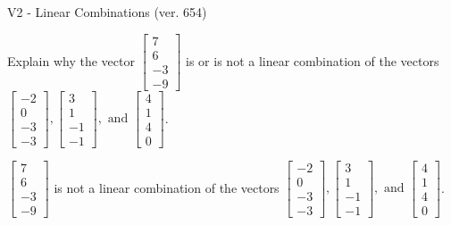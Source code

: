 \begin{exercise}
  \begin{exerciseTitle}V2 - Linear Combinations (ver. 654)\end{exerciseTitle}
  \begin{exerciseStatement}
    Explain why the vector \(\left[\begin{array}{c}
7 \\
6 \\
-3 \\
-9
\end{array}\right]\)  is or is not a linear 
	combination of the vectors \(\left[\begin{array}{c}
-2 \\
0 \\
-3 \\
-3
\end{array}\right] , \left[\begin{array}{c}
3 \\
1 \\
-1 \\
-1
\end{array}\right] , \text{ and } \left[\begin{array}{c}
4 \\
1 \\
4 \\
0
\end{array}\right]\).
	


  \end{exerciseStatement}
  \begin{exerciseAnswer}
   \(\left[\begin{array}{c}
7 \\
6 \\
-3 \\
-9
\end{array}\right]\) 
  	 is not  
	a linear combination of the vectors \(\left[\begin{array}{c}
-2 \\
0 \\
-3 \\
-3
\end{array}\right] , \left[\begin{array}{c}
3 \\
1 \\
-1 \\
-1
\end{array}\right] , \text{ and } \left[\begin{array}{c}
4 \\
1 \\
4 \\
0
\end{array}\right]\).

	
  


  \end{exerciseAnswer}
\end{exercise}